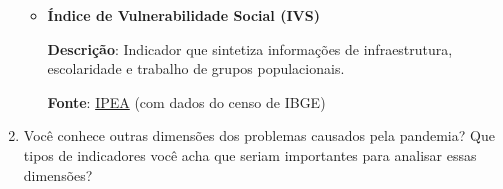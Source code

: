 \begin{task}{}
\begin{enumerate}
\begin{itemize}[itemsep=1em]
\item \textbf{Índice de Vulnerabilidade Social (IVS)}

\textbf{Descrição}: Indicador que sintetiza informações de infraestrutura, escolaridade e trabalho de grupos populacionais.

\textbf{Fonte}: \href{http://ivs.ipea.gov.br/index.php/pt/}{IPEA} (com dados do censo de IBGE)
\end{itemize}

\item Você conhece outras dimensões dos problemas causados pela pandemia? Que tipos de indicadores você acha que seriam importantes para analisar essas dimensões?

\end{enumerate}
\end{task}



